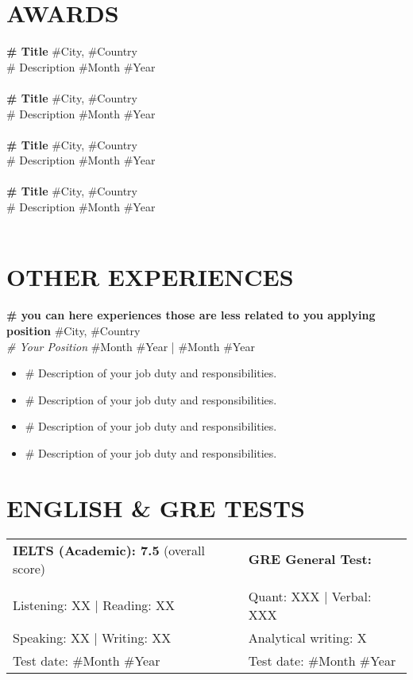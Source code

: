 \documentclass[a4paper,9pt]{extarticle}
\begin{document}
    \section*{AWARDS}
    \textbf{\# Title}  \hfill \#City, \#Country\\
    \# Description \hfill \#Month \#Year\\ \\
    \textbf{\# Title}  \hfill \#City, \#Country\\
    \# Description \hfill \#Month \#Year\\ \\
    \textbf{\# Title}  \hfill \#City, \#Country\\
    \# Description \hfill \#Month \#Year\\ \\
    \textbf{\# Title}  \hfill \#City, \#Country\\
    \# Description \hfill \#Month \#Year\\ \\

    \section*{OTHER EXPERIENCES}
    \noindent
    \textbf{\# you can here experiences those are less related to you applying position}  \hfill \#City, \#Country\\ %
    \textit{\# Your Position} \hfill \#Month \#Year | \#Month \#Year %
    \begin{itemize}
        \item \# Description of your job duty and responsibilities.
        \item \# Description of your job duty and responsibilities.
        \item \# Description of your job duty and responsibilities.
        \item \# Description of your job duty and responsibilities.
    \end{itemize}


    \section*{ENGLISH \& GRE TESTS}
    \begin{tabularx}{1\textwidth}{
            >{\raggedright\arraybackslash}X
            >{\raggedright\arraybackslash}X }
        \textbf{IELTS (Academic): 7.5} (overall score)&   \textbf{GRE General Test:}\\ \\
        Listening: XX | Reading: XX & Quant: XXX | Verbal: XXX\\
        Speaking: XX   | Writing: XX& Analytical writing: X\\
        Test date: \#Month \#Year &Test date: \#Month \#Year
    \end{tabularx}
\end{document}
